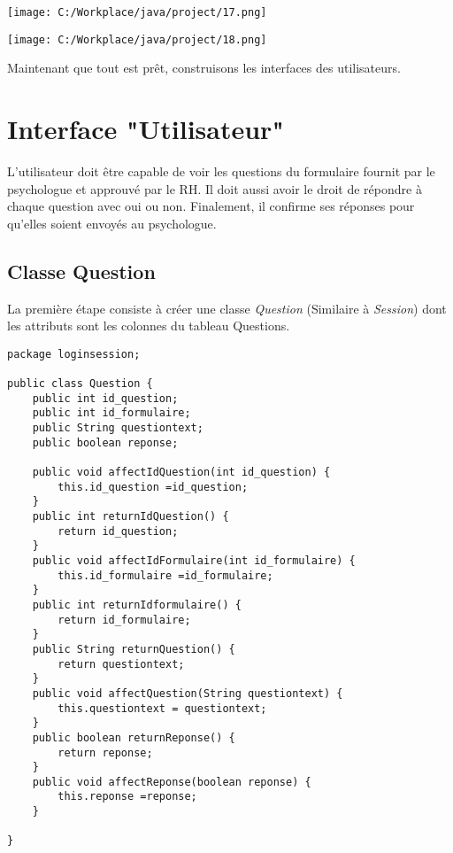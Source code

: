 \documentclass[12]{article}
\begin{document}
 



\begin{center}
\hspace*{-2cm}\texttt{[image: C:/Workplace/java/project/17.png]}

\vspace{1cm}
\hspace*{-3cm}\texttt{[image: C:/Workplace/java/project/18.png]}
\end{center}


Maintenant que tout est prêt, construisons les interfaces des utilisateurs.\\

\section{Interface "Utilisateur"}
\indent


L'utilisateur doit être capable de voir les questions du formulaire fournit par le psychologue et approuvé par le RH. Il doit aussi avoir le droit de répondre à chaque question avec oui ou non. Finalement, il confirme ses réponses pour qu'elles soient envoyés au psychologue.\\
\subsection{Classe Question}

La première étape consiste à créer une classe \textit{Question} (Similaire à \textit{Session}) dont les attributs sont les colonnes du tableau Questions. \\




\begin{scriptsize}

\lstset{language=java}
\begin{lstlisting}
package loginsession;

public class Question {
	public int id_question;
	public int id_formulaire;
	public String questiontext;
	public boolean reponse;
	
	public void affectIdQuestion(int id_question) {
		this.id_question =id_question;
	}
	public int returnIdQuestion() {
		return id_question;
	}
	public void affectIdFormulaire(int id_formulaire) {
		this.id_formulaire =id_formulaire;
	}
	public int returnIdformulaire() {
		return id_formulaire;
	}
	public String returnQuestion() {
		return questiontext;
	}
	public void affectQuestion(String questiontext) {
		this.questiontext = questiontext;
	}
	public boolean returnReponse() {
		return reponse;
	}
	public void affectReponse(boolean reponse) {
		this.reponse =reponse;
	}
	
}
\end{lstlisting}

\end{scriptsize}
\end{document}
